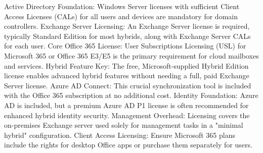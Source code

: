 Active Directory Foundation: Windows Server licenses with sufficient
Client Access Licenses (CALs) for all users and devices are mandatory for domain
controllers. Exchange Server Licensing: An Exchange Server license is required, typically Standard Edition for most hybrids, along with Exchange Server CALs for each
user. Core Office 365 License: User Subscriptions Licensing (USL) for Microsoft 365
or Office 365 E3/E5 is the primary requirement for cloud mailboxes and services.
Hybrid Feature Key: The free, Microsoft-supplied Hybrid Edition license enables advanced hybrid features without needing a full, paid Exchange Server license. Azure
AD Connect: This crucial synchronization tool is included with the Office 365 subscription at no additional cost. Identity Foundation: Azure AD is included, but a
premium Azure AD P1 license is often recommended for enhanced hybrid identity
security. Management Overhead: Licensing covers the on-premises Exchange server
used solely for management tasks in a "minimal hybrid" configuration. Client Access
Licensing: Ensure Microsoft 365 plans include the rights for desktop Office apps or
purchase them separately for users.



